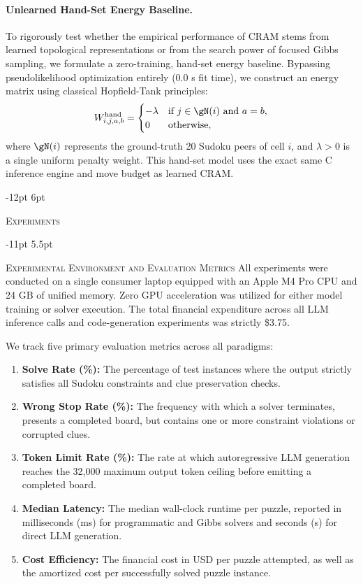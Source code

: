 \documentclass{article} %
\makeatletter
\renewcommand\section{\@startsection{section}{1}{\z@}%
  {-12pt \@plus -3pt \@minus -2pt}%
  {6pt \@plus 2pt}%
  {\normalfont\fontsize{12}{14}\selectfont\scshape\raggedright}}
\renewcommand\subsection{\@startsection{subsection}{2}{\z@}%
  {-11pt \@plus -3pt \@minus -2pt}%
  {5.5pt \@plus 2pt}%
  {\normalfont\fontsize{10}{12}\selectfont\scshape\raggedright}}
\makeatother
\begin{document}
\paragraph{Unlearned Hand-Set Energy Baseline.} To rigorously test whether the empirical performance of CRAM stems from learned topological representations or from the search power of focused Gibbs sampling, we formulate a zero-training, hand-set energy baseline. Bypassing pseudolikelihood optimization entirely ($0.0$ s fit time), we construct an energy matrix using classical Hopfield-Tank principles:
\begin{equation}
    W^{\text{hand}}_{i, j, a, b} = \begin{cases}
        -\lambda & \text{if } j \in \gN(i) \text{ and } a = b, \\
        0 & \text{otherwise},
    \end{cases}
\end{equation}
where $\gN(i)$ represents the ground-truth 20 Sudoku peers of cell $i$, and $\lambda > 0$ is a single uniform penalty weight. This hand-set model uses the exact same C inference engine and move budget as learned CRAM.

\section{\textsc{Experiments}}
\label{sec:experiments}

\subsection{\textsc{Experimental Environment and Evaluation Metrics}}
\label{sec:exp_setup}
All experiments were conducted on a single consumer laptop equipped with an Apple M4 Pro CPU and 24 GB of unified memory. Zero GPU acceleration was utilized for either model training or solver execution. The total financial expenditure across all LLM inference calls and code-generation experiments was strictly \$3.75.

We track five primary evaluation metrics across all paradigms:
\begin{enumerate}
    \item \textbf{Solve Rate (\%):} The percentage of test instances where the output strictly satisfies all Sudoku constraints and clue preservation checks.
    \item \textbf{Wrong Stop Rate (\%):} The frequency with which a solver terminates, presents a completed board, but contains one or more constraint violations or corrupted clues.
    \item \textbf{Token Limit Rate (\%):} The rate at which autoregressive LLM generation reaches the 32,000 maximum output token ceiling before emitting a completed board.
    \item \textbf{Median Latency:} The median wall-clock runtime per puzzle, reported in milliseconds (ms) for programmatic and Gibbs solvers and seconds (s) for direct LLM generation.
    \item \textbf{Cost Efficiency:} The financial cost in USD per puzzle attempted, as well as the amortized cost per successfully solved puzzle instance.
\end{enumerate}
\end{document}

